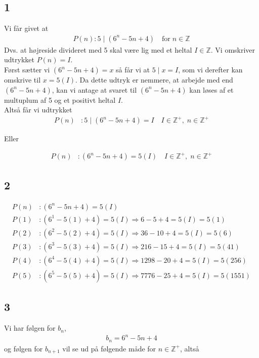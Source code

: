 \documentclass[a4paper]{article}
\newcommand{\setZ}{\mathbb{Z}}
\begin{document}
\subsection*{1}
Vi får givet at 
\begin{align*}
P(n) : 5\;|\;(6^n-5n+4) \quad \text{for} \; n \in \setZ
\end{align*}
Dvs. at højreside divideret med 5 skal være lig med et heltal $I \in \setZ$. Vi omskriver udtrykket $P(n)=I$. \\
Først sætter vi $(6^n-5n+4)=x$ så får vi at $5\;|\;x=I$, som vi derefter kan omskrive til $x=5(I)$. Da dette udtryk er nemmere, at arbejde med end $(6^n-5n+4)$, kan vi antage at svaret til $(6^n-5n+4)$ kan løses af et multuplum af 5 og et positivt heltal $I$.\\
Altså får vi udtrykket
\begin{align*}
P(n) & : 5\;|\;(6^n-5n+4) = I \quad I \in \setZ^+, \; n \in \setZ^+
\end{align*}
\begin{center}
Eller
\end{center}
\begin{align*}
P(n) & : (6^n-5n+4) = 5(I) \quad I \in \setZ^+, \; n \in \setZ^+ 
\end{align*}

\subsection*{2}
\begin{align*}
P(n) & : (6^n-5n+4) = 5(I) \\
P(1) & : (6^1-5(1)+4) = 5(I) \Rightarrow 6-5+4 = 5(I) = 5(1)\\
P(2) & : (6^2-5(2)+4) = 5(I) \Rightarrow 36-10+4 = 5(I) = 5(6)\\
P(3) & : (6^3-5(3)+4) = 5(I) \Rightarrow 216-15+4 = 5(I) = 5(41)\\
P(4) & : (6^4-5(4)+4) = 5(I) \Rightarrow 1298-20+4 = 5(I) = 5(256)\\
P(5) & : (6^5-5(5)+4) = 5(I) \Rightarrow 7776-25+4 = 5(I) = 5(1551)
\end{align*}

\subsection*{3}
Vi har følgen for $b_n$,
\begin{align*}
b_n = 6^n-5n+4
\end{align*}
og følgen for $b_{n+1}$ vil se ud på følgende måde for $n\in\setZ^+$, altså
\end{document}
